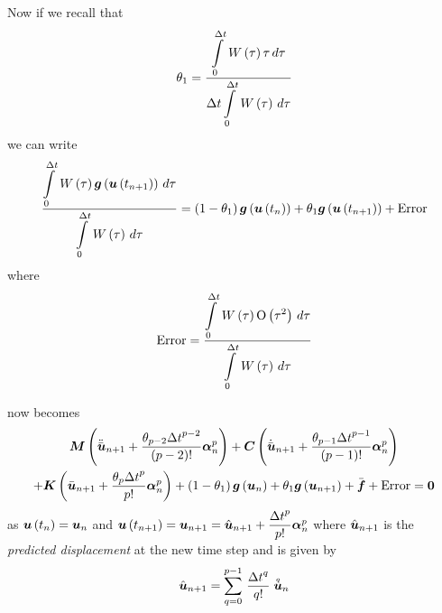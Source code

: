 Now if we recall that
\begin{equation}
\theta_{1}=\dfrac{  \displaystyle\int\limits_{0}^{\Delta t} \, W\left( \tau \right) \tau\,d\tau }{\Delta t  \displaystyle\int\limits_{0}^{\Delta t} \, W\left( \tau \right) \,d\tau }
\end{equation}
we can write
\begin{equation}
  \dfrac{  \displaystyle\int\limits_{0}^{\Delta t} \, W\left( \tau \right)  \boldsymbol{g}\left(  \boldsymbol{u}\left( t_{n+1} \right)  \right) \,d\tau }
  {  \displaystyle\int\limits_{0}^{\Delta t} \, W\left( \tau \right) \,d\tau }=\left( 1-\theta_{1} \right) \boldsymbol{g}\left(  \boldsymbol{u}\left( t_{n} \right)  \right) +
  \theta_{1} \boldsymbol{g}\left(  \boldsymbol{u}\left( t_{n+1} \right)  \right) +\text{Error}
\end{equation}
where
\begin{equation}
  \text{Error}=\dfrac{  \displaystyle\int\limits_{0}^{\Delta t} \, W\left( \tau \right)  \mathrm{O}\left( \tau^{2} \right) \,d\tau }{
      \displaystyle\int\limits_{0}^{\Delta t} \, W\left( \tau \right) \,d\tau }
\end{equation}

 now becomes
\begin{multline}
  \matr{M}\pbrac{\ddot{\bar{\vectr{u}}}_{n+1}+\dfrac{\theta_{p-2}{\Delta
        t}^{p-2}}{\factorial{p-2}}\vectr{\alpha}^{p}_{n}}+
  \matr{C}\pbrac{\dot{\bar{\vectr{u}}}_{n+1}+\dfrac{\theta_{p-1}{\Delta
        t}^{p-1}}{\factorial{p-1}}\vectr{\alpha}^{p}_{n}}\\
  +\matr{K}\pbrac{\bar{\vectr{u}}_{n+1}+\dfrac{\theta_{p}{\Delta
        t}^{p}}{p!}\vectr{\alpha}^{p}_{n}}+ 
  \pbrac{1-\theta_{1}}\fnof{\vectr{g}}{\vectr{u}_{n}}+\theta_{1}\fnof{\vectr{g}}{\vectr{u}_{n+1}}+\bar{\vectr{f}}+
  \text{Error}=\vectr{0}
  \label{eqn:dynamic2}
\end{multline}
as $ \boldsymbol{u}\left( t_{n} \right) =\boldsymbol{u}_{n}$ and
$ \boldsymbol{u}\left( t_{n+1} \right) =\boldsymbol{u}_{n+1}=\hat{\boldsymbol{u}}_{n+1}+
\dfrac{{\Delta t}^{p}}{p!}\boldsymbol{\alpha}^{p}_{n}$ where $\hat{\boldsymbol{u}}_{n+1}$
is the \emph{predicted displacement} at the new time step and is given by
\begin{equation}
  \hat{\boldsymbol{u}}_{n+1}=  \displaystyle\sum_{q=0}^{p-1} \,\dfrac{{\Delta
        t}^{q}}{q!} \stackrel{\scriptscriptstyle q}{\boldsymbol{u}} _{n} 
\end{equation}

